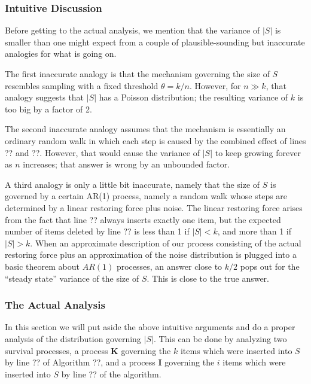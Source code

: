 \documentclass{sig-alternate}
\begin{document}
\subsubsection{Intuitive Discussion}

Before getting to the actual analysis, we mention that the variance of $|S|$
is smaller than one might expect from a couple of plausible-sounding but 
inaccurate analogies for what is going on.

The first inaccurate analogy is that the mechanism governing the size of 
$S$ resembles sampling with a fixed threshold $\theta = k/n$. However,
for $n \gg k$, that analogy suggests that $|S|$ has a Poisson distribution; 
the resulting variance of $k$ is too big by a factor of 2.

The second inaccurate analogy assumes that the mechanism is essentially an ordinary random walk in which each step is caused by the
combined effect of lines ?? and ??. However, that would cause the variance of $|S|$ to keep growing forever as $n$ increases;
that answer is wrong by an unbounded factor.

A third analogy is only a little bit inaccurate, namely that the size
of $S$ is governed by a certain AR(1) process, namely a random walk
whose steps are determined by a linear restoring force plus noise.
The linear restoring force arises from the fact that line ?? always
inserts exactly one item, but the expected number of items deleted by
line ?? is less than 1 if $|S| < k$, and more than 1 if $|S| > k$.
When an approximate description of our process consisting of the
actual restoring force plus an approximation of the noise distribution
is plugged into a basic theorem about $AR(1)$ processes, an answer
close to $k/2$ pops out for the ``steady state'' variance of the size
of $S$. This is close to the true answer.

\subsubsection{The Actual Analysis}

In this section we will put aside the above intuitive arguments and
do a proper analysis of the distribution governing $|S|$. This can be done
by analyzing two survival processes, a process {\bf K} governing the
$k$ items which were inserted into $S$ by line ?? of Algorithm ??, and
a process {\bf I} governing the $i$ items which were inserted into $S$
by line ?? of the algorithm.
\end{document}
